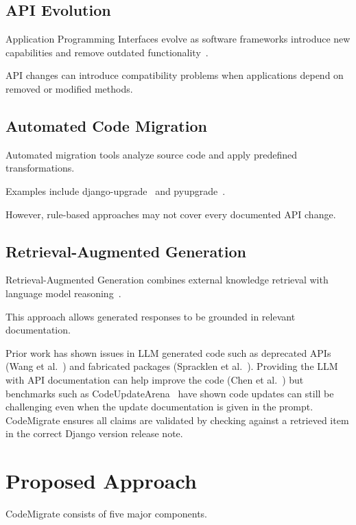 \documentclass[conference]{IEEEtran}
\begin{document}
\subsection{API Evolution}

Application Programming Interfaces evolve as software
frameworks introduce new capabilities and remove
outdated functionality~\cite{dig2006apis}.

API changes can introduce compatibility problems
when applications depend on removed or modified methods.

\subsection{Automated Code Migration}

Automated migration tools analyze source code and
apply predefined transformations.

Examples include django-upgrade~\cite{djangoupgrade} and pyupgrade~\cite{pyupgrade}.

However, rule-based approaches may not cover every
documented API change.

\subsection{Retrieval-Augmented Generation}

Retrieval-Augmented Generation combines external
knowledge retrieval with language model reasoning~\cite{lewis2020rag}.

This approach allows generated responses to be
grounded in relevant documentation.

Prior work has shown issues in LLM generated code such as deprecated APIs (Wang et
al.~\cite{wang2025deprecated}) and fabricated packages (Spracklen et al.~\cite{spracklen2025package}).
Providing the LLM with API documentation can help improve the code (Chen et
al.~\cite{chen2025apidocs}) but benchmarks such as CodeUpdateArena~\cite{liu2024codeupdatearena}
have shown code updates can still be challenging even when the update documentation is given in the
prompt. CodeMigrate ensures all claims are validated
by checking against a retrieved item in the correct Django version release note.

\section{Proposed Approach}

CodeMigrate consists of five major components.
\end{document}
